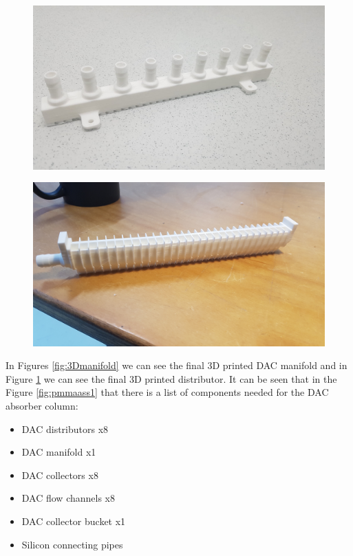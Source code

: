 \begin{figure}[H]
\centering
\begin{minipage}{.5\textwidth}
  \centering
  \includegraphics[width=0.9\linewidth]{images/mywork/Sprint1/Manifold.jpg}
  \label{fig:3Dmanifold}
\end{minipage}%
\begin{minipage}{.5\textwidth}
  \centering
  \includegraphics[width=0.9\linewidth]{images/mywork/Sprint1/Distributor.jpg}
  \label{fig:3Ddistributor}
\end{minipage}
\end{figure}

In Figures \ref{fig:3Dmanifold} we can see the final 3D printed DAC manifold and in Figure \ref{fig:3Ddistributor} we can see the final 3D printed distributor. It can be seen that in the Figure \ref{fig:pmmaass1} that there is a list of components needed for the DAC absorber column: 
\begin{itemize}
    \item DAC distributors x8 
    \item DAC manifold x1 
    \item DAC collectors x8 
    \item DAC flow channels x8
    \item DAC collector bucket x1 
    \item Silicon connecting pipes
\end{itemize}

